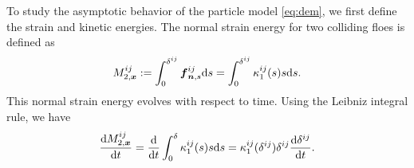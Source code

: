 \documentclass[a4paper,11pt]{article}
\numberwithin{equation}{section}
\theoremstyle{definition}
\newtheorem{remark}[theorem]{Remark}
\newcommand{\bfx}{\boldsymbol{x}}
\newcommand{\bfn}{\boldsymbol{n}}
\newcommand{\bff}{\boldsymbol{f}}
\def\d{{  \rm d}}
\begin{document}
To study the asymptotic behavior of the particle model  \eqref{eq:dem}, we first define the strain and kinetic energies. 
The normal strain energy for two colliding floes is defined as 
\begin{equation}\label{eq:nse}
    M_{2,\bfx}^{ij} := \int_0^{\delta^{ij}} \bff_{\bfn,s}^{ij} \d s = \int_0^{\delta^{ij}}  \kappa^{ij}_1(s) s \d s.
\end{equation} 
 This normal strain energy evolves with respect to time. Using the Leibniz integral rule, we have
  \begin{equation} \label{eq:nsedt}
 \frac{\d M_{2,\bfx}^{ij}}{\d t} 
 = \frac{\d}{\d t} \int_0^\delta   \kappa^{ij}_1(s) s \d s  =   \kappa^{ij}_1(\delta^{ij}) \delta^{ij} \frac{\d \delta^{ij}}{\d t}.
 \end{equation}
 

\end{document}
